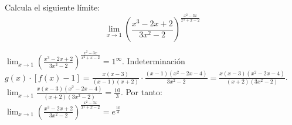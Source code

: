 \documentclass[addpoints,spanish, 12pt,a4paper]{exam}
\begin{document}
\begin{questions}

%
%










\question[6] Calcula el siguiente límite: $$\lim_{x \to 1} \left(\frac{x^{3} - 2 x + 2}{3 x^{2} - 2}\right)^{\frac{x^{2} - 3 x}{x^{2} + x - 2}}$$
\begin{solution}
$\lim_{x \to 1} \left(\frac{x^{3} - 2 x + 2}{3 x^{2} - 2}\right)^{\frac{x^{2} - 3 x}{x^{2} + x - 2}}=1^\infty$. Indeterminación \\ $g(x)\cdot\left[f(x)-1\right]=\frac{x \left(x - 3\right)}{\left(x - 1\right) \left(x + 2\right)}\cdot\frac{\left(x - 1\right) \left(x^{2} - 2 x - 4\right)}{3 x^{2} - 2}=\frac{x \left(x - 3\right) \left(x^{2} - 2 x - 4\right)}{\left(x + 2\right) \left(3 x^{2} - 2\right)}$. \\ $\lim_{x \to 1}\frac{x \left(x - 3\right) \left(x^{2} - 2 x - 4\right)}{\left(x + 2\right) \left(3 x^{2} - 2\right)}=\frac{10}{3}$. Por tanto: \\ $\lim_{x \to 1} \left(\frac{x^{3} - 2 x + 2}{3 x^{2} - 2}\right)^{\frac{x^{2} - 3 x}{x^{2} + x - 2}}=e^{\frac{10}{3}}$


\end{solution}
\end{questions}
\end{document}
